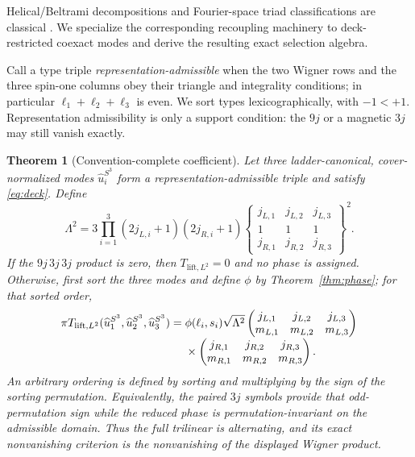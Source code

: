 \documentclass[12pt]{article}
\newtheorem{theorem}{Theorem}[section]
\theoremstyle{definition}
\theoremstyle{remark}
\begin{document}
Helical/Beltrami decompositions and Fourier-space triad classifications are
classical \cite{ConstantinMajda1988,Waleffe1992,Waleffe1993}.  We specialize
the corresponding recoupling machinery to deck-restricted coexact modes and
derive the resulting exact selection algebra.

Call a type triple \emph{representation-admissible} when the two Wigner rows
and the three spin-one columns obey their triangle and integrality conditions;
in particular $\ell_1+\ell_2+\ell_3$ is even.  We sort types
lexicographically, with $-1<+1$.  Representation admissibility is only a
support condition: the $9j$ or a magnetic $3j$ may still vanish exactly.

\begin{theorem}[Convention-complete coefficient]\label{thm:triad}
Let three ladder-canonical, cover-normalized modes
$\widehat u_i^{S^3}$ form a representation-admissible triple and satisfy
\eqref{eq:deck}.  Define
\begin{equation}\label{eq:lambda}
 \Lambda^2=
 3\prod_{i=1}^3(2j_{L,i}+1)(2j_{R,i}+1)
 \begin{Bmatrix}
 j_{L,1}&j_{L,2}&j_{L,3}\\
 1&1&1\\
 j_{R,1}&j_{R,2}&j_{R,3}
 \end{Bmatrix}^{\!2}.
\end{equation}
If the $9j\,3j\,3j$ product is zero, then
$T_{\mathrm{lift},L^2}=0$ and no phase is assigned.  Otherwise, first sort the
three modes and define $\phi$ by Theorem~\ref{thm:phase}; for that sorted
order,
\begin{align}
 \pi T_{\mathrm{lift},L^2}
   (\widehat u_1^{S^3},\widehat u_2^{S^3},\widehat u_3^{S^3})
 ={}&\phi(\ell_i,s_i)\sqrt{\Lambda^2}
 \begin{pmatrix}
 j_{L,1}&j_{L,2}&j_{L,3}\\
 m_{L,1}&m_{L,2}&m_{L,3}
 \end{pmatrix}\notag\\[-1mm]
 &\times
 \begin{pmatrix}
 j_{R,1}&j_{R,2}&j_{R,3}\\
 m_{R,1}&m_{R,2}&m_{R,3}
 \end{pmatrix}.\label{eq:fulltriad}
\end{align}
An arbitrary ordering is defined by sorting and multiplying by the sign of
the sorting permutation.  Equivalently, the paired $3j$ symbols provide that
odd-permutation sign while the reduced phase is permutation-invariant on the
admissible domain.  Thus the full trilinear is alternating, and its exact
nonvanishing criterion is the nonvanishing of the displayed Wigner product.
\end{theorem}
\end{document}
